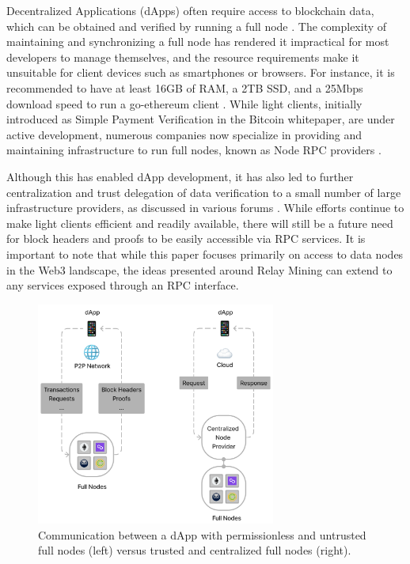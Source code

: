 \documentclass[runningheads]{llncs}
\begin{document}
Decentralized Applications (dApps) often require access to blockchain data, which can be obtained and verified by running a full node \cite{alchemyProsCons}. The complexity of maintaining and synchronizing a full node has rendered it impractical for most developers to manage themselves, and the resource requirements make it unsuitable for client devices such as smartphones or browsers. For instance, it is recommended to have at least 16GB of RAM, a 2TB SSD, and a 25Mbps download speed to run a go-ethereum client \cite{ethereumHardwareRequirements}. While light clients, initially introduced as Simple Payment Verification in the Bitcoin whitepaper, are under active development, numerous companies now specialize in providing and maintaining infrastructure to run full nodes, known as Node RPC providers \cite{nakamoto2008bitcoin}.

Although this has enabled dApp development, it has also led to further centralization and trust delegation of data verification to a small number of large infrastructure providers, as discussed in various forums \cite{moxie2022}. While efforts continue to make light clients efficient and readily available, there will still be a future need for block headers and proofs to be easily accessible via RPC services. It is important to note that while this paper focuses primarily on access to data nodes in the Web3 landscape, the ideas presented around Relay Mining can extend to any services exposed through an RPC interface.

\begin{figure}
    \centering
    \includegraphics[width=0.7\textwidth]{light_full_node.png}
    \caption{Communication between a dApp with permissionless and untrusted full nodes (left) versus trusted and centralized full nodes (right).} \label{fig:light-full-node}
\end{figure}
\end{document}
